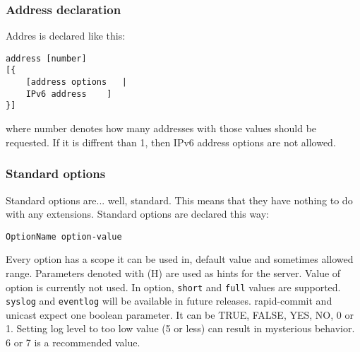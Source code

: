 \subsubsection{Address declaration}
Addres is declared like this:

\begin{verbatim}
address [number] 
[{ 
	[address options   |
	IPv6 address    ] 
}]
\end{verbatim}
where number denotes how many addresses with those values should be
requested. If it is diffrent than 1, then IPv6 address options are not
allowed.

\subsubsection{Standard options}
Standard options are... well, standard. This means that they have 
nothing to do with any extensions. Standard options are declared this way:

\begin{verbatim}
OptionName option-value
\end{verbatim}

Every option has a scope it can be used in, default value and
sometimes allowed range. Parameters denoted with (H) are used as hints
for the server. Value of  option is currently not
used. In  option, \verb+short+ and \verb+full+ values are
supported. \verb+syslog+ and \verb+eventlog+ will be available in
future releases. rapid-commit and unicast expect one boolean
parameter. It can be TRUE, FALSE, YES, NO, 0 or 1. Setting log level
to too low value (5 or less) can result in mysterious behavior. 6 or 7
is a recommended value.


